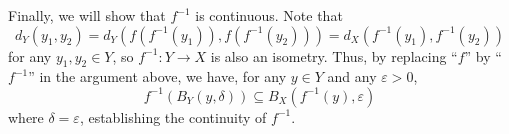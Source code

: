 \begin{enumerate}
\begin{pf}
Finally, we will show that \(f^{-1}\) is continuous. Note that
\[
d_Y(y_1,y_2)=d_Y(f(f^{-1}(y_1)),f(f^{-1}(y_2)))=d_X(f^{-1}(y_1),f^{-1}(y_2))
\]
for any \(y_1,y_2\in Y\), so \(f^{-1}:Y\to X\) is also an isometry. Thus, by
replacing ``\(f\)'' by ``\(f^{-1}\)'' in the argument above, we have, for any
\(y\in Y\) and any \(\varepsilon>0\),
\[
f^{-1}(B_Y(y,\delta))\subseteq B_X(f^{-1}(y),\varepsilon)
\]
where \(\delta=\varepsilon\), establishing the continuity of \(f^{-1}\).
\end{pf}
\end{enumerate}

